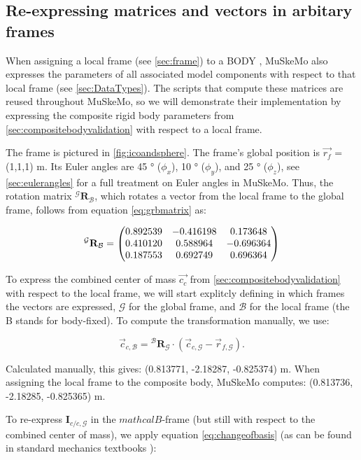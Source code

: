 \documentclass{article}
\begin{document}
\subsection{Re-expressing matrices and vectors in arbitary frames}
\label{sec:framevalidation}
When assigning a local frame (see \ref{sec:frame}) to a BODY , MuSkeMo also expresses the parameters of all associated model components with respect to that local frame (see \ref{sec:DataTypes}). The scripts that compute these matrices are reused throughout MuSkeMo, so we will demonstrate their implementation by expressing the composite rigid body parameters from \ref{sec:compositebodyvalidation} with respect to a local frame.

The frame is pictured in \ref{fig:icoandsphere}. The frame's global position is \(\vec{r_f}\) = (1,1,1) \si{m}. Its Euler angles are 45 \si{\degree} (\( \phi_x \)), 10 \si{\degree} (\( \phi_y \)), and 25 \si{\degree} (\( \phi_z \)), see \ref{sec:eulerangles} for a full treatment on Euler angles in MuSkeMo. Thus, the rotation matrix \({}^{\mathcal{G}} \mathbf{R}_{\mathcal{B}}\), which rotates a vector from the local frame to the global frame, follows from equation \ref{eq:grbmatrix} as:


\begin{equation}
    {}^{\mathcal{G}} \mathbf{R}_{\mathcal{B}} =
    \mqty(
    0.892539 & -0.416198 & 0.173648 \\
    0.410120 & 0.588964 & -0.696364 \\
    0.187553 & 0.692749 & 0.696364
    )
\end{equation}

To express the combined center of mass \(\vec{c_{c}}\) from \ref{sec:compositebodyvalidation} with respect to the local frame, we will start explitcly defining in which frames the vectors are expressed, \(\mathcal{G}\) for the global frame, and \(\mathcal{B}\) for the local frame (the B stands for body-fixed). To compute the transformation manually, we use:

\begin{equation}
\vec{c}_{c,\mathcal{B}} = {}^{\mathcal{B}} \mathbf{R}_{\mathcal{G}} \cdot (\vec{c}_{c,\mathcal{G}} - \vec{r}_{f,\mathcal{G}}).
\end{equation}

Calculated manually, this gives: (0.813771, -2.18287, -0.825374) \si{m}. When assigning the local frame to the composite body, MuSkeMo computes: (0.813736, -2.18285, -0.825365) \si{m}. 

To re-express \(\mathbf{I}_{c/c,{\mathcal{G}}}\) in the \(mathcal{B}\)-frame (but still with respect to the combined center of mass), we apply equation \ref{eq:changeofbasis} (as can be found in standard mechanics textbooks \cite{valleryAdvancedDynamics2019}):
\end{document}
